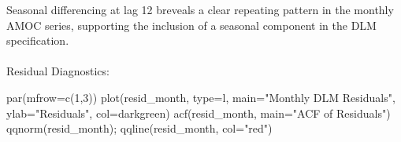 \documentclass[
  11pt,
]{article}
\makeatletter
\let\oldparagraph\paragraph
\renewcommand{\paragraph}{
    \@ifstar
      \xxxParagraphStar
      \xxxParagraphNoStar
  }
\newcommand{\xxxParagraphStar}[1]{\oldparagraph*{#1}\mbox{}}
\newcommand{\xxxParagraphNoStar}[1]{\oldparagraph{#1}\mbox{}}
\newenvironment{Shaded}{\begin{snugshade}}{\end{snugshade}}
\newcommand{\AttributeTok}[1]{\textcolor[rgb]{0.40,0.45,0.13}{#1}}
\newcommand{\CommentTok}[1]{\textcolor[rgb]{0.37,0.37,0.37}{#1}}
\newcommand{\ControlFlowTok}[1]{\textcolor[rgb]{0.00,0.23,0.31}{\textbf{#1}}}
\newcommand{\DecValTok}[1]{\textcolor[rgb]{0.68,0.00,0.00}{#1}}
\newcommand{\FunctionTok}[1]{\textcolor[rgb]{0.28,0.35,0.67}{#1}}
\newcommand{\NormalTok}[1]{\textcolor[rgb]{0.00,0.23,0.31}{#1}}
\newcommand{\OtherTok}[1]{\textcolor[rgb]{0.00,0.23,0.31}{#1}}
\newcommand{\SpecialCharTok}[1]{\textcolor[rgb]{0.37,0.37,0.37}{#1}}
\newcommand{\StringTok}[1]{\textcolor[rgb]{0.13,0.47,0.30}{#1}}
\makeatother
\begin{document}
Seasonal differencing at lag 12 breveals a clear repeating pattern in
the monthly AMOC series, supporting the inclusion of a seasonal
component in the DLM specification.

\paragraph{Residual Diagnostics:}\label{residual-diagnostics}

\begin{Shaded}
\end{Shaded}

\begin{Shaded}
\begin{Highlighting}[]
\FunctionTok{par}\NormalTok{(}\AttributeTok{mfrow=}\FunctionTok{c}\NormalTok{(}\DecValTok{1}\NormalTok{,}\DecValTok{3}\NormalTok{))}
\FunctionTok{plot}\NormalTok{(resid\_month, }\AttributeTok{type=}\StringTok{\textquotesingle{}l\textquotesingle{}}\NormalTok{, }\AttributeTok{main=}\StringTok{"Monthly DLM Residuals"}\NormalTok{, }\AttributeTok{ylab=}\StringTok{"Residuals"}\NormalTok{, }\AttributeTok{col=}\StringTok{\textquotesingle{}darkgreen\textquotesingle{}}\NormalTok{)}
\FunctionTok{acf}\NormalTok{(resid\_month, }\AttributeTok{main=}\StringTok{"ACF of Residuals"}\NormalTok{)}
\FunctionTok{qqnorm}\NormalTok{(resid\_month); }\FunctionTok{qqline}\NormalTok{(resid\_month, }\AttributeTok{col=}\StringTok{"red"}\NormalTok{)}
\end{Highlighting}
\end{Shaded}
\end{document}
